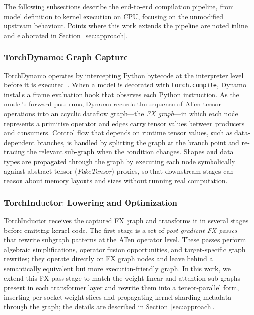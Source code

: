 \documentclass[conference]{IEEEtran}
\begin{document}
The following subsections describe the end-to-end compilation pipeline,
from model definition to kernel execution on CPU, focusing on the
unmodified upstream behaviour.  Points where this work extends the
pipeline are noted inline and elaborated in Section~\ref{sec:approach}.

\subsubsection{TorchDynamo: Graph Capture}
\label{sec:bg_dynamo}

TorchDynamo operates by intercepting Python bytecode at the interpreter
level before it is executed~\cite{ansel2024pytorch2}.
When a model is decorated with \texttt{torch.compile}, Dynamo installs
a frame evaluation hook that observes each Python instruction.
As the model's forward pass runs, Dynamo records the sequence of ATen
tensor operations into an acyclic dataflow graph—the \emph{FX graph}—in
which each node represents a primitive operator and edges carry tensor
values between producers and consumers.
Control flow that depends on runtime tensor values, such as
data-dependent branches, is handled by splitting the graph at the
branch point and re-tracing the relevant sub-graph when the condition
changes.  Shapes and data types are propagated through the graph by
executing each node symbolically against abstract tensor
(\emph{FakeTensor}) proxies, so that downstream stages can reason about
memory layouts and sizes without running real computation.

\subsubsection{TorchInductor: Lowering and Optimization}
\label{sec:bg_inductor}

TorchInductor receives the captured FX graph and transforms it in
several stages before emitting kernel code.
The first stage is a set of \emph{post-gradient FX passes} that
rewrite subgraph patterns at the ATen operator level.
These passes perform algebraic simplifications, operator fusion
opportunities, and target-specific graph rewrites; they operate
directly on FX graph nodes and leave behind a semantically equivalent
but more execution-friendly graph.
In this work, we extend this FX pass stage to match the weight-linear
and attention sub-graphs present in each transformer layer and rewrite
them into a tensor-parallel form, inserting per-socket weight slices
and propagating kernel-sharding metadata through the graph; the details
are described in Section~\ref{sec:approach}.
\end{document}
